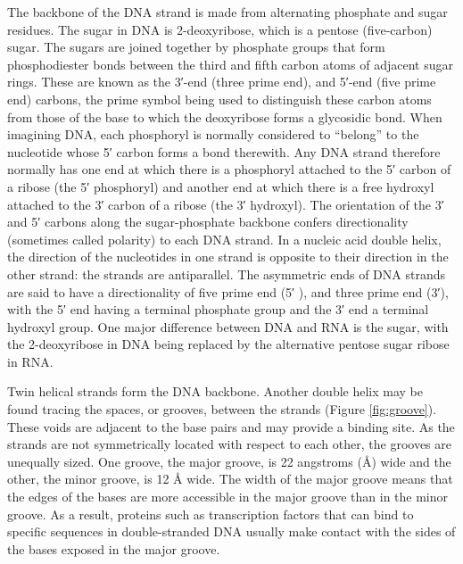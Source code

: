 The backbone of the DNA strand is made from alternating phosphate and sugar residues. The sugar in DNA is 2-deoxyribose, which is a pentose (five-carbon) sugar. The sugars are joined together by phosphate groups that form phosphodiester bonds between the third and fifth carbon atoms of adjacent sugar rings. These are known as the 3′-end (three prime end), and 5′-end (five prime end) carbons, the prime symbol being used to distinguish these carbon atoms from those of the base to which the deoxyribose forms a glycosidic bond. When imagining DNA, each phosphoryl is normally considered to ``belong'' to the nucleotide whose 5′ carbon forms a bond therewith. Any DNA strand therefore normally has one end at which there is a phosphoryl attached to the 5′ carbon of a ribose (the 5′ phosphoryl) and another end at which there is a free hydroxyl attached to the 3′ carbon of a ribose (the 3′ hydroxyl). The orientation of the 3′ and 5′ carbons along the sugar-phosphate backbone confers directionality (sometimes called polarity) to each DNA strand. In a nucleic acid double helix, the direction of the nucleotides in one strand is opposite to their direction in the other strand: the strands are antiparallel. The asymmetric ends of DNA strands are said to have a directionality of five prime end (5′ ), and three prime end (3′), with the 5′ end having a terminal phosphate group and the 3′ end a terminal hydroxyl group. One major difference between DNA and RNA is the sugar, with the 2-deoxyribose in DNA being replaced by the alternative pentose sugar ribose in RNA.

Twin helical strands form the DNA backbone. Another double helix may be found tracing the spaces, or grooves, between the strands (Figure \ref{fig:groove}). These voids are adjacent to the base pairs and may provide a binding site. As the strands are not symmetrically located with respect to each other, the grooves are unequally sized. One groove, the major groove, is 22 angstroms (Å) wide and the other, the minor groove, is 12 Å wide. The width of the major groove means that the edges of the bases are more accessible in the major groove than in the minor groove. As a result, proteins such as transcription factors that can bind to specific sequences in double-stranded DNA usually make contact with the sides of the bases exposed in the major groove.



